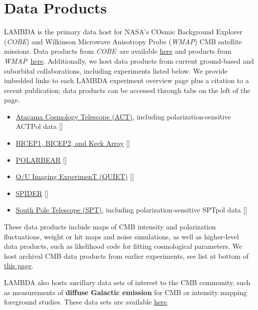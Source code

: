 \documentclass[letter]{emulateapj}
\newcommand{\COBE}{\textsl{COBE}}
\newcommand{\WMAP}{\textsl{WMAP}}
\begin{document}
\section{Data Products}

LAMBDA is the primary data host for NASA's COsmic Background Explorer (\COBE) and Wilkinson Microwave Anisotropy Probe (\WMAP) CMB satellite missions. Data products from \COBE\ are available \href{https://lambda.gsfc.nasa.gov/product/cobe/}{here} and products from \WMAP\ \href{https://lambda.gsfc.nasa.gov/product/map/current/}{here}. Additionally, we host data products from current ground-based and suborbital collaborations, including experiments listed below. We provide imbedded links to each LAMBDA experiment overview page plus a citation to a recent publication; data products can be accessed through tabs on the left of the page.
\begin{itemize}
\item \href{https://lambda.gsfc.nasa.gov/product/act/}{Atacama Cosmology Telescope (ACT)}, including polarization-sensitive ACTPol data []
\item \href{https://lambda.gsfc.nasa.gov/product/bicepkeck/}{BICEP1, BICEP2, and Keck Array} [] 
\item \href{https://lambda.gsfc.nasa.gov/product/polarbear/}{POLARBEAR} []
\item \href{https://lambda.gsfc.nasa.gov/product/quiet/}{Q/U Imaging ExperimenT (QUIET)} [] 
\item \href{https://lambda.gsfc.nasa.gov/product/spider/}{SPIDER} [] 
\item \href{https://lambda.gsfc.nasa.gov/product/spt/}{South Pole Telescope (SPT)}, including polarization-sensitive SPTpol data [] 
\end{itemize}
These data products include maps of CMB intensity and polarization fluctuations, weight or hit maps and noise simulations, as well as higher-level data products, such as likelihood code for fitting cosmological parameters. We host archival CMB data products from earlier experiments, see list at bottom of \href{https://lambda.gsfc.nasa.gov/product/}{this page}.

LAMBDA also hosts ancillary data sets of interest to the CMB community, such as measurements of {\bf diffuse Galactic emission} for CMB or intensity mapping foreground studies. These data sets are available \href{https://lambda.gsfc.nasa.gov/product/foreground/fg_diffuse.cfm}{here}.
\end{document}
